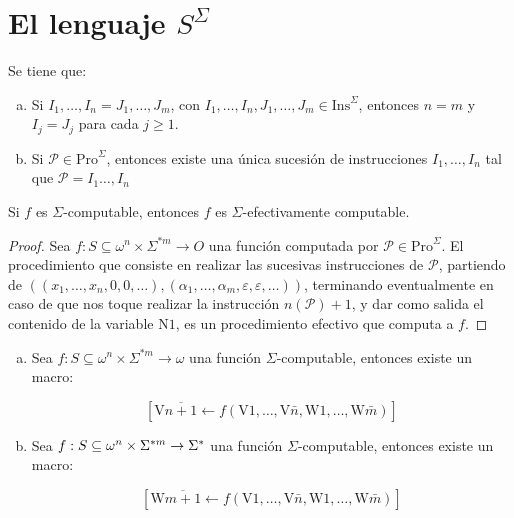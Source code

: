 \section{El lenguaje ${S}^{\Sigma}$}

  \begin{lemma}
    \PN Se tiene que:

    \begin{enumerate}[a)]
      \item Si $I_{1}, \dotsc, I_{n} = J_{1}, \dotsc, J_{m}$, con $I_{1}, \dotsc, I_{n}, J_{1}, \dotsc, J_{m} \in
        \mathrm{Ins}^{\Sigma}$, entonces $n=m$ y $I_{j}=J_{j}$ para cada $j \geq 1$.
      \item Si $\mathcal{P} \in \mathrm{Pro}^{\Sigma}$, entonces existe una única sucesión de instrucciones $I_{1},
        \dotsc, I_{n}$ tal que $\mathcal{P} = I_{1} \dotsc, I_{n}$
    \end{enumerate}
  \end{lemma}

  \begin{theorem}
    \PN Si $f$ es $\Sigma$-computable, entonces $f$ es $\Sigma$-efectivamente computable.
  \end{theorem}
  \begin{proof}
    \PN Sea $f: S \subseteq \omega^{n} \times \Sigma^{\ast m} \rightarrow O$ una función computada por $\mathcal{P} \in
    \mathrm{Pro}^{\Sigma}$. El procedimiento que consiste en realizar las sucesivas instrucciones de $\mathcal{P}$,
    partiendo de $((x_{1},\dotsc,x_{n},0,0,\dotsc), (\alpha_{1},\dotsc,\alpha_{m},\varepsilon,\varepsilon,\dotsc))$,
    terminando eventualmente en caso de que nos toque realizar la instrucción $n(\mathcal{P})+1$, y dar como salida el
    contenido de la variable $\mathrm{N}1$, es un procedimiento efectivo que computa a $f$.
  \end{proof}

  \begin{proposition}
    \begin{enumerate}[a)]
      \item Sea $f: S \subseteq \omega^{n} \times \Sigma^{\ast m} \rightarrow \omega$ una función $\Sigma$-computable,
        entonces existe un macro:

        \[
          \left[\mathrm{V}\overline{n+1}\leftarrow f(\mathrm{V}1,\dotsc,\mathrm{V}\bar{n},\mathrm{W}1,\dotsc,\mathrm{W}
          \bar{m})\right]
        \]

      \item Sea $f: S \subseteq \omega^{n} \times \Sigma^{\ast m} \rightarrow \Sigma^{\ast}$ una función $\Sigma$-computable,
        entonces existe un macro:

        \[
          \left[\mathrm{W}\overline{m+1}\leftarrow f(\mathrm{V}1,\dotsc,\mathrm{V}\bar{n},\mathrm{W}1,\dotsc,\mathrm{W}
          \bar{m})\right]
        \]
    \end{enumerate}
  \end{proposition}

